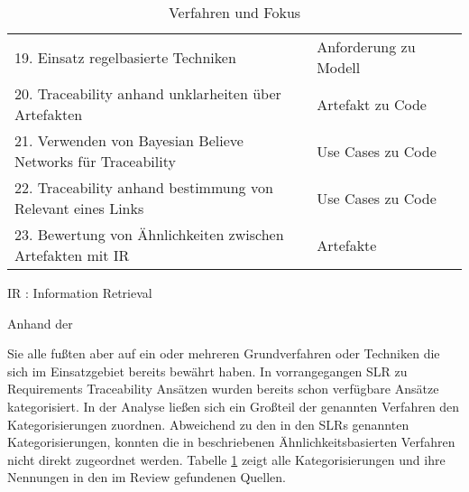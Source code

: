 \begin{table}[htbp]
\begin{threeparttable}
\begin{tabularx}{\columnwidth}{@{}XXl@{}}
19. Einsatz regelbasierte Techniken & Anforderung zu Modell & \cite{Mder2012TowardsMaintenance, Spanoudakis2004Rule-basedRelations} \\
20. Traceability anhand unklarheiten über Artefakten & Artefakt zu Code & \cite{Ghabi2015ExploitingCode} \\
21. Verwenden von Bayesian Believe Networks für Traceability & Use Cases zu Code & \cite{Omoronyia2011ExploringTraceability} \\
22. Traceability anhand bestimmung von Relevant eines Links & Use Cases zu Code & \cite{Omoronyia2011ExploringTraceability} \\
23. Bewertung von Ähnlichkeiten zwischen Artefakten mit IR & Artefakte & \cite{Bavota2014EnhancingInformation} \\
\bottomrule
\end{tabularx}
\medskip
    IR : Information Retrieval
\end{threeparttable}
\caption{Verfahren und Fokus}
\label{tab:auswertung_verfahren_kategorisierung}
\end{table}

Anhand der 

Sie alle fußten aber auf ein oder mehreren Grundverfahren oder Techniken die sich im Einsatzgebiet bereits bewährt haben. In vorrangegangen SLR zu Requirements Traceability Ansätzen \cite{Javed2014ACode, Mader2012TowardsMaintenance} wurden bereits schon verfügbare Ansätze kategorisiert. In der Analyse ließen sich ein Großteil der genannten Verfahren den Kategorisierungen zuordnen. Abweichend zu den in den SLRs genannten Kategorisierungen, konnten die in \cite{Tsuchiya2015InteractiveLogs, Omoronyia2011ExploringTraceability, Leuser2010TacklingSpecifications, Spanoudakis2004Rule-basedRelations} beschriebenen Ähnlichkeitsbasierten Verfahren nicht direkt zugeordnet werden. Tabelle \ref{tab:auswertung_verfahren_kategorisierung} zeigt alle Kategorisierungen und ihre Nennungen in den im Review gefundenen Quellen.

